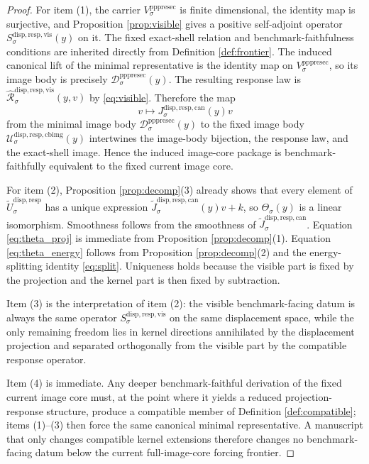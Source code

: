 \documentclass[11pt]{article}
\newcommand{\PrePreProtoSectionVertical}[1]{V_{#1}^{\mathrm{pppresec}}}
\newcommand{\PrePreProtoSectionResidualBody}[1]{\mathcal D_{#1}^{\mathrm{pppresec}}}
\newcommand{\CanonicalLift}[1]{J_{#1}^{\mathrm{disp,resp,can}}}
\newcommand{\CanonicalImageBody}[1]{\mathcal U_{#1}^{\mathrm{disp,resp,cbimg}}}
\newcommand{\CoreForcedBodyResponse}[1]{\widehat{\mathscr R}_{#1}^{\mathrm{disp,resp,vis}}}
\newcommand{\VisibleResponseOperator}[1]{S_{#1}^{\mathrm{disp,resp,vis}}}
\newcommand{\CompatibleCarrier}[1]{\widetilde U_{#1}^{\mathrm{disp,resp}}}
\newcommand{\CompatibleLift}[1]{\widetilde J_{#1}^{\mathrm{disp,resp,can}}}
\begin{document}
\begin{proof}
For item (1), the carrier \(\PrePreProtoSectionVertical{\sigma}\) is finite dimensional, the identity map is surjective, and Proposition \ref{prop:visible} gives a positive self-adjoint operator \(\VisibleResponseOperator{\sigma}(y)\) on it. The fixed exact-shell relation and benchmark-faithfulness conditions are inherited directly from Definition \ref{def:frontier}. The induced canonical lift of the minimal representative is the identity map on \(\PrePreProtoSectionVertical{\sigma}\), so its image body is precisely \(\PrePreProtoSectionResidualBody{\sigma}(y)\). The resulting response law is \(\CoreForcedBodyResponse{\sigma}(y,v)\) by \eqref{eq:visible}. Therefore the map
\[
v\longmapsto \CanonicalLift{\sigma}(y)v
\]
from the minimal image body \(\PrePreProtoSectionResidualBody{\sigma}(y)\) to the fixed image body \(\CanonicalImageBody{\sigma}(y)\) intertwines the image-body bijection, the response law, and the exact-shell image. Hence the induced image-core package is benchmark-faithfully equivalent to the fixed current image core.

For item (2), Proposition \ref{prop:decomp}(3) already shows that every element of \(\CompatibleCarrier{\sigma}\) has a unique expression \(\CompatibleLift{\sigma}(y)v+k\), so \(\Theta_{\sigma}(y)\) is a linear isomorphism. Smoothness follows from the smoothness of \(\CompatibleLift{\sigma}\). Equation \eqref{eq:theta_proj} is immediate from Proposition \ref{prop:decomp}(1). Equation \eqref{eq:theta_energy} follows from Proposition \ref{prop:decomp}(2) and the energy-splitting identity \eqref{eq:split}. Uniqueness holds because the visible part is fixed by the projection and the kernel part is then fixed by subtraction.

Item (3) is the interpretation of item (2): the visible benchmark-facing datum is always the same operator \(\VisibleResponseOperator{\sigma}\) on the same displacement space, while the only remaining freedom lies in kernel directions annihilated by the displacement projection and separated orthogonally from the visible part by the compatible response operator.

Item (4) is immediate. Any deeper benchmark-faithful derivation of the fixed current image core must, at the point where it yields a reduced projection-response structure, produce a compatible member of Definition \ref{def:compatible}; items (1)--(3) then force the same canonical minimal representative. A manuscript that only changes compatible kernel extensions therefore changes no benchmark-facing datum below the current full-image-core forcing frontier.
\end{proof}
\end{document}
